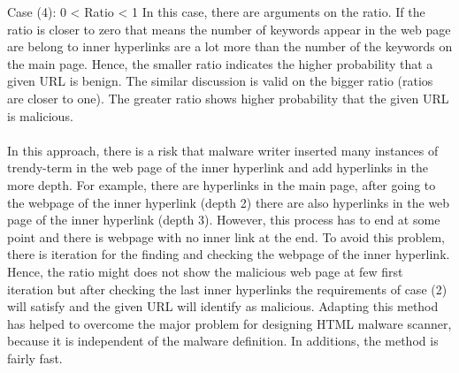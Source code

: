 Case (4): 0 < Ratio < 1
In this case, there are arguments on the ratio. If the ratio is closer to zero that means the number of keywords appear in the web page are belong to inner hyperlinks are a lot more than the number of the keywords on the main page. Hence, the smaller ratio indicates the higher probability that a given URL is benign. The similar discussion is valid on the bigger ratio (ratios are closer to one). The greater ratio shows higher probability that the given URL is malicious. 

\paragraph{} 
In this approach, there is a risk that malware writer inserted many instances of trendy-term in the web page of the inner hyperlink and add hyperlinks in the more depth. For example, there are hyperlinks in the main page, after going to the webpage of the inner hyperlink (depth 2) there are also hyperlinks in the web page of the inner hyperlink (depth 3). However, this process has to end at some point and there is webpage with no inner link at the end. To avoid this problem, there is iteration for the finding and checking the webpage of the inner hyperlink. Hence, the ratio might does not show the malicious web page at few first iteration but after checking the last inner hyperlinks the requirements of case (2) will satisfy and the given URL will identify as malicious. Adapting this method has helped to overcome the major problem for designing HTML malware scanner, because it is independent of the malware definition. In additions, the method is fairly fast.  
